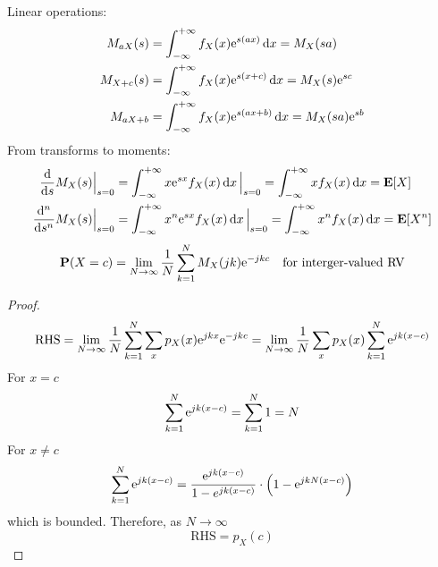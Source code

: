 Linear operations:
\begin{equation}
\begin{aligned}
    M_{aX}(s) &= \int_{-\infty}^{+\infty} f_{X}(x) \mathrm{e}^{s(ax)} \dd{x} = M_{X}(sa) \\
    M_{X + c}(s) &= \int_{-\infty}^{+\infty} f_{X}(x) \mathrm{e}^{s(x + c)} \dd{x} = M_{X}(s) \mathrm{e}^{sc} \\ 
    M_{aX + b} &= \int_{-\infty}^{+\infty} f_{X}(x) \mathrm{e}^{s(ax + b)} \dd{x} = M_{X}(sa) \mathrm{e}^{sb}
\end{aligned}
\end{equation}
From transforms to moments:
\begin{equation}
\begin{aligned}
    \dv{s} M_{X}(s) \Big|_{s=0} &= \int_{-\infty}^{+\infty} x \mathrm{e}^{sx} f_{X}(x) \dd{x} \Big|_{s=0} = \int_{-\infty}^{+\infty} x f_{X}(x) \dd{x} = \mathbf{E}[X] \\
    \dv[n]{s} M_{X}(s) \Big|_{s=0} &= \int_{-\infty}^{+\infty} x^n \mathrm{e}^{sx} f_{X}(x) \dd{x} \Big|_{s=0} = \int_{-\infty}^{+\infty} x^n f_{X}(x) \dd{x} = \mathbf{E}[X^n]
\end{aligned}
\end{equation}
\begin{equation}
    \mathbf{P}(X = c) = \lim_{N \to \infty} \frac{1}{N} \sum_{k=1}^{N} M_{X}(jk) \mathrm{e}^{-jk c} \quad \text{for interger-valued RV}
\end{equation}
\begin{proof}
    \begin{equation}
        \text{RHS} = \lim_{N \to \infty} \frac{1}{N} \sum_{k=1}^{N} \sum_{x} p_{X}(x) \mathrm{e}^{jkx} \mathrm{e}^{-jk c} = \lim_{N \to \infty} \frac{1}{N} \sum_{x} p_{X}(x) \sum_{k=1}^{N} \mathrm{e}^{jk(x - c)} 
    \end{equation}
    For $x = c$
    \begin{equation}
        \sum_{k=1}^{N} \mathrm{e}^{jk(x - c)} = \sum_{k=1}^{N} 1 = N
    \end{equation}
    For $x \neq c$
    \begin{equation}
        \sum_{k=1}^{N} \mathrm{e}^{jk(x - c)} = \frac{\mathrm{e}^{jk(x - c)}}{1 - e^{jk(x - c)}} \cdot \qty(1 - \mathrm{e}^{jkN(x - c)})
    \end{equation}
    which is bounded. Therefore, as $N \to \infty$
    \begin{equation}
        \text{RHS} = p_{X}(c)
    \end{equation}
\end{proof}

